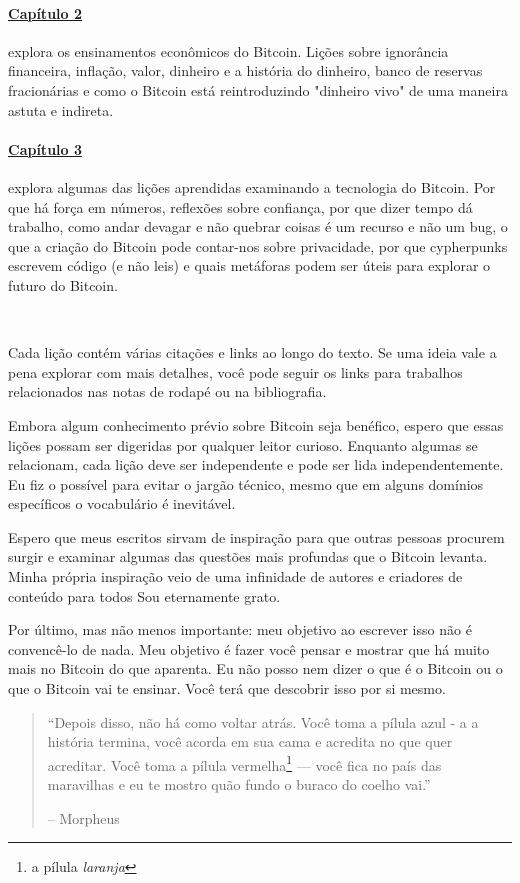 \paragraph{\hyperref[ch:economics]{Capítulo 2}}{explora os ensinamentos econômicos
do Bitcoin. Lições sobre ignorância financeira, inflação, valor, dinheiro e a
história do dinheiro, banco de reservas fracionárias e como o Bitcoin está reintroduzindo
"dinheiro vivo" de uma maneira astuta e indireta.}

\paragraph{\hyperref[ch:technology]{Capítulo 3}}{explora algumas das lições
aprendidas examinando a tecnologia do Bitcoin. Por que há força em
números, reflexões sobre confiança, por que dizer tempo dá trabalho, como andar devagar
e não quebrar coisas é um recurso e não um bug, o que a criação do Bitcoin pode
contar-nos sobre privacidade, por que cypherpunks escrevem código (e não leis) e quais metáforas podem ser úteis para explorar o futuro do Bitcoin.}

~

Cada lição contém várias citações e links ao longo do texto. Se uma ideia vale a pena explorar com mais detalhes, você pode seguir os links para trabalhos relacionados nas
notas de rodapé ou na bibliografia.

Embora algum conhecimento prévio sobre Bitcoin seja benéfico, espero que essas
lições possam ser digeridas por qualquer leitor curioso. Enquanto algumas se relacionam,
cada lição deve ser independente e pode ser lida independentemente. Eu
fiz o possível para evitar o jargão técnico, mesmo que em alguns domínios específicos
o vocabulário é inevitável.

Espero que meus escritos sirvam de inspiração para que outras pessoas procurem
surgir e examinar algumas das questões mais profundas que o Bitcoin levanta. Minha própria inspiração veio de uma infinidade de autores e criadores de conteúdo para todos
Sou eternamente grato.

Por último, mas não menos importante: meu objetivo ao escrever isso não é convencê-lo de nada.
Meu objetivo é fazer você pensar e mostrar que há muito mais no Bitcoin
do que aparenta. Eu não posso nem dizer o que é o Bitcoin ou o que o Bitcoin vai
te ensinar. Você terá que descobrir isso por si mesmo.

\begin{quotation}\begin{samepage}
\enquote{Depois disso, não há como voltar atrás. Você toma a pílula azul - a
a história termina, você acorda em sua cama e acredita no que quer
acreditar. Você toma a pílula vermelha\footnote{a pílula \textit{laranja}} --- você fica no país das maravilhas e eu te mostro quão fundo o buraco do coelho vai.}
\begin{flushright} -- Morpheus
\end{flushright}\end{samepage}\end{quotation}

